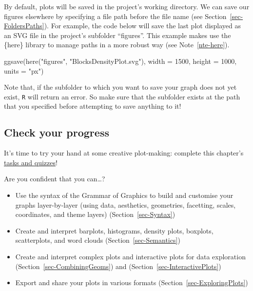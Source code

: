 \documentclass[
  letterpaper,
  DIV=11,
  numbers=noendperiod]{scrreprt}
\newenvironment{Shaded}{\begin{snugshade}}{\end{snugshade}}
\newcommand{\AttributeTok}[1]{\textcolor[rgb]{0.40,0.45,0.13}{#1}}
\newcommand{\DecValTok}[1]{\textcolor[rgb]{0.68,0.00,0.00}{#1}}
\newcommand{\FunctionTok}[1]{\textcolor[rgb]{0.28,0.35,0.67}{#1}}
\newcommand{\NormalTok}[1]{\textcolor[rgb]{0.00,0.23,0.31}{#1}}
\newcommand{\StringTok}[1]{\textcolor[rgb]{0.13,0.47,0.30}{#1}}
\providecommand{\tightlist}{%
  \setlength{\itemsep}{0pt}\setlength{\parskip}{0pt}}
\begin{document}
By default, plots will be saved in the project's working directory. We
can save our figures elsewhere by specifying a file path before the file
name (see Section~\ref{sec-FoldersPaths}). For example, the code below
will save the last plot displayed as an SVG file in the project's
subfolder ``figures''. This example makes use the \{here\} library to
manage paths in a more robust way (see Note~\ref{nte-here}).

\begin{Shaded}
\begin{Highlighting}[]
\FunctionTok{ggsave}\NormalTok{(}\FunctionTok{here}\NormalTok{(}\StringTok{"figures"}\NormalTok{, }\StringTok{"BlocksDensityPlot.svg"}\NormalTok{),}
       \AttributeTok{width =} \DecValTok{1500}\NormalTok{,}
       \AttributeTok{height =} \DecValTok{1000}\NormalTok{,}
       \AttributeTok{units =} \StringTok{"px"}\NormalTok{)}
\end{Highlighting}
\end{Shaded}

Note that, if the subfolder to which you want to save your graph does
not yet exist, \texttt{R} will return an error. So make sure that the
subfolder exists at the path that you specified before attempting to
save anything to it!

\subsection*{Check your progress}\label{check-your-progress-19}

It's time to try your hand at some creative plot-making: complete this
chapter's
\href{https://elenlefoll.github.io/RstatsTextbook/quizzes/11_quiz.html}{tasks
and quizzes}! 

Are you confident that you can\ldots?

\begin{itemize}
\tightlist
\item[$\square$]
  Use the syntax of the Grammar of Graphics to build and customise your
  graphs layer-by-layer (using data, aesthetics, geometries, facetting,
  scales, coordinates, and theme layers) (Section~\ref{sec-Syntax})
\item[$\square$]
  Create and interpret barplots, histograms, density plots, boxplots,
  scatterplots, and word clouds (Section~\ref{sec-Semantics})
\item[$\square$]
  Create and interpret complex plots and interactive plots for data
  exploration (Section~\ref{sec-CombiningGeoms}) and
  (Section~\ref{sec-InteractivePlots})
\item[$\square$]
  Export and share your plots in various formats
  (Section~\ref{sec-ExploringPlots})
\end{itemize}
\end{document}
